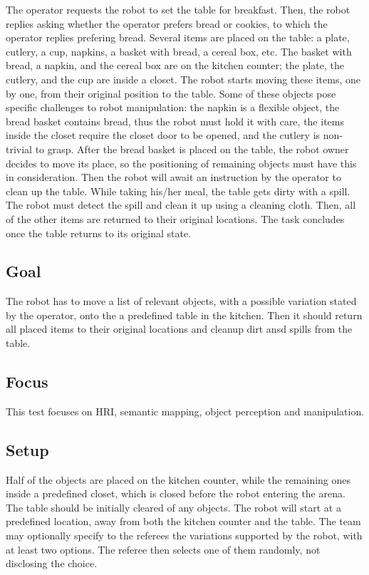 The operator requests the robot to set the table for breakfast. Then, the robot replies asking whether the operator prefers bread or cookies, to which the operator replies prefering bread.  Several items are placed on the table: a plate, cutlery, a cup, napkins, a basket with bread, a cereal box, etc. The basket with bread, a napkin, and the cereal box are on the kitchen counter; the plate, the cutlery, and the cup are inside a closet. The robot starts moving these items, one by one, from their original position to the table. Some of these objects pose specific challenges to robot manipulation: the napkin is a flexible object, the bread basket contains bread, thus the robot must hold it with care, the items inside the closet require the closet door to be opened, and the cutlery is non-trivial to grasp. After the bread basket is placed on the table, the robot owner decides to move its place, so the positioning of remaining objects must have this in consideration. Then the robot will await an instruction by the operator to clean up the table. While taking his/her meal, the table gets dirty with a spill. The robot must detect the spill and clean it up using a cleaning cloth. Then, all of the other items are returned to their original locations. The task concludes once the table returns to its original state.

\subsection{Goal}

The robot has to move a list of relevant objects, with a possible variation stated by the operator, onto the a predefined table in the kitchen. Then it should return all placed items to their original locations and cleanup dirt ansd spills from the table.

\subsection{Focus}

This test focuses on HRI, semantic mapping, object perception and manipulation.

\subsection{Setup}

Half of the objects are placed on the kitchen counter, while the remaining ones inside a predefined closet, which is closed before the robot entering the arena. The table should be initially cleared of any objects. The robot will start at a predefined location, away from both the kitchen counter and the table. The team may optionally specify to the referees the variations supported by the robot, with at least two options. The referee then selects one of them randomly, not disclosing the choice.

